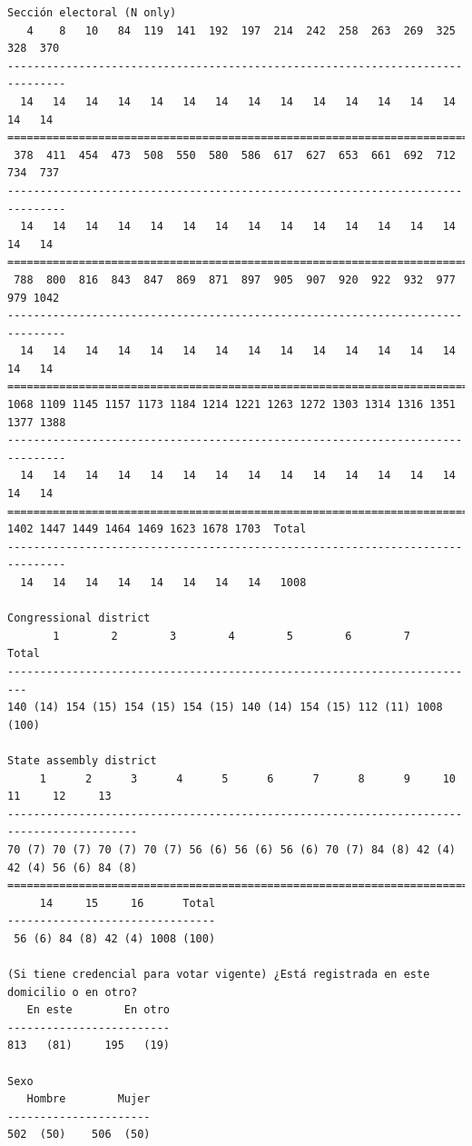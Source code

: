 \documentclass[letter,12pt]{article}
\begin{document}
\begin{scriptsize}
\begin{verbatim}
Sección electoral (N only)
   4    8   10   84  119  141  192  197  214  242  258  263  269  325  328  370 
-------------------------------------------------------------------------------
  14   14   14   14   14   14   14   14   14   14   14   14   14   14   14   14 
===============================================================================
 378  411  454  473  508  550  580  586  617  627  653  661  692  712  734  737 
-------------------------------------------------------------------------------
  14   14   14   14   14   14   14   14   14   14   14   14   14   14   14   14 
===============================================================================
 788  800  816  843  847  869  871  897  905  907  920  922  932  977  979 1042 
-------------------------------------------------------------------------------
  14   14   14   14   14   14   14   14   14   14   14   14   14   14   14   14 
===============================================================================
1068 1109 1145 1157 1173 1184 1214 1221 1263 1272 1303 1314 1316 1351 1377 1388 
-------------------------------------------------------------------------------
  14   14   14   14   14   14   14   14   14   14   14   14   14   14   14   14 
===============================================================================
1402 1447 1449 1464 1469 1623 1678 1703  Total
-------------------------------------------------------------------------------
  14   14   14   14   14   14   14   14   1008

Congressional district
       1        2        3        4        5        6        7      Total
-------------------------------------------------------------------------
140 (14) 154 (15) 154 (15) 154 (15) 140 (14) 154 (15) 112 (11) 1008 (100) 

State assembly district
     1      2      3      4      5      6      7      8      9     10     11     12     13  
------------------------------------------------------------------------------------------
70 (7) 70 (7) 70 (7) 70 (7) 56 (6) 56 (6) 56 (6) 70 (7) 84 (8) 42 (4) 42 (4) 56 (6) 84 (8) 
==========================================================================================
     14     15     16      Total
--------------------------------
 56 (6) 84 (8) 42 (4) 1008 (100)

(Si tiene credencial para votar vigente) ¿Está registrada en este domicilio o en otro?
   En este        En otro
-------------------------
813   (81)     195   (19) 

Sexo
   Hombre        Mujer
----------------------
502  (50)    506  (50)
 

\end{verbatim}
\end{scriptsize}
\end{document}
